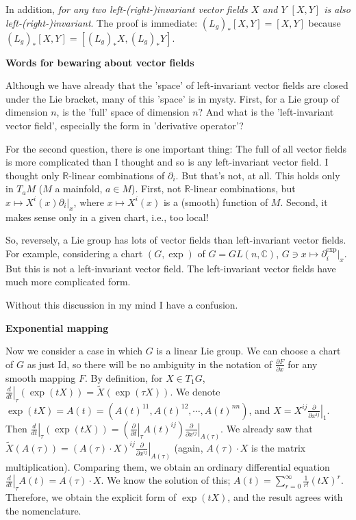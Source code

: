 \documentclass{article}
\newcommand{\ReR}{\mathbb{R}}
\newcommand{\CoC}{\mathbb{C}}
\newcommand{\parder}[2]{\frac{\partial #1}{\partial #2}}
\newcommand{\parderbar}[3]{\left. \frac{\partial #1}{\partial #2} \right|_{#3}}
\newcommand{\ordderbar}[3]{\left. \frac{d #1}{d #2} \right|_{#3}}
\begin{document}
In addition, \textit{for any two left-(right-)invariant vector fields $X$ and $Y$ $[X, Y]$ is also left-(right-)invariant}.
The proof is immediate: $(L_g)_* [X, Y] = [X, Y]$ because $(L_g)_* [X, Y] = [(L_g)_* X, (L_g)_* Y]$.

\newpage

\textbf{Words for bewaring about vector fields}

Although we have already that the 'space' of left-invariant vector fields are closed under the Lie bracket, many of this 'space' is in mysty.
First, for a Lie group of dimension $n$, is the 'full' space of dimension $n$?
And what is the 'left-invariant vector field', especially the form in 'derivative operator'?

For the second question, there is one important thing: The full of all vector fields is more complicated than I thought and so is any left-invariant vector field.
I thought only $\ReR$-linear combinations of $\partial_i$.
But that's not, at all.
This holds only in $T_a M$ ($M$ a mainfold, $a \in M$).
First, not $\ReR$-linear combinations, but $x \mapsto X^i(x) \partial_i|_x$, where $x \mapsto X^i(x)$ is a (smooth) function of $M$.
Second, it makes sense only in a given chart, i.e., too local!

So, reversely, a Lie group has lots of vector fields than left-invariant vector fields.
For example, considering a chart $(G, \exp)$ of $G = GL(n, \CoC)$, $G \ni x \mapsto \partial^{\exp}_i|_x$.
But this is not a left-invariant vector field.
The left-invariant vector fields have much more complicated form.

Without this discussion in my mind I have a confusion.


\newpage

\textbf{Exponential mapping}



Now we consider a case in which $G$ is a linear Lie group.
We can choose a chart of $G$ as just $\textrm{Id}$, so there will be no ambiguity in the notation of $\parder{F}{x}$ for any smooth mapping $F$.
By definition, for $X \in T_1 G$, $\ordderbar{}{t}{\tau} (\exp{(tX)}) = \tilde{X}(\exp{(\tau X)})$.
We denote $\exp{(tX)} = A(t) = (A(t)^{11}, A(t)^{12}, \cdots, A(t)^{nn})$, and $X = X^{ij} \parderbar{}{x^{ij}}{1}$.
Then $\ordderbar{}{t}{\tau} (\exp{(tX)}) = (\parderbar{}{t}{\tau} A(t)^{ij}) \parderbar{}{x^{ij}}{A(\tau)}$.
We already saw that $\tilde{X}(A(\tau)) = (A(\tau) \cdot X)^{ij} \parderbar{}{x^{ij}}{A(\tau)}$ (again, $A(\tau) \cdot X$ is the matrix multiplication).
Comparing them, we obtain an ordinary differential equation $\ordderbar{}{t}{\tau} A(t) = A(\tau) \cdot X$.
We know the solution of this; $A(t) = \sum_{r = 0}^\infty \frac{1}{r!} (tX)^r$.
Therefore, we obtain the explicit form of $\exp{(tX)}$, and the result agrees with the nomenclature.
\end{document}
